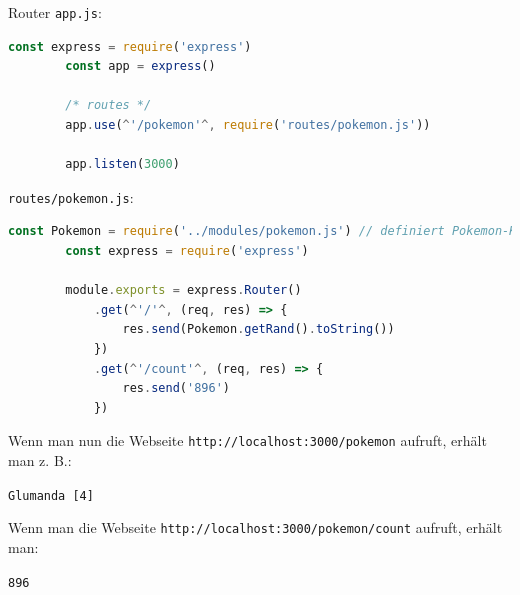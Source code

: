 \begin{example}{Router}
    \texttt{app.js}:
    \begin{lstlisting}[language=JavaScript]
        const express = require('express')
        const app = express()

        /* routes */
        app.use(^'/pokemon'^, require('routes/pokemon.js'))

        app.listen(3000)
    \end{lstlisting}

    \texttt{routes/pokemon.js}:
    \begin{lstlisting}[language=JavaScript]
        const Pokemon = require('../modules/pokemon.js') // definiert Pokemon-Klasse
        const express = require('express')
        
        module.exports = express.Router()
            .get(^'/'^, (req, res) => {
                res.send(Pokemon.getRand().toString())
            })
            .get(^'/count'^, (req, res) => {
                res.send('896')
            })
    \end{lstlisting}

    Wenn man nun die Webseite \texttt{http://localhost:3000/pokemon} aufruft, erhält man z. B.:

    \begin{center}
        \texttt{Glumanda [4]}
    \end{center}

    Wenn man die Webseite \texttt{http://localhost:3000/pokemon/count} aufruft, erhält man:

    \begin{center}
        \texttt{896}
    \end{center}
\end{example}

